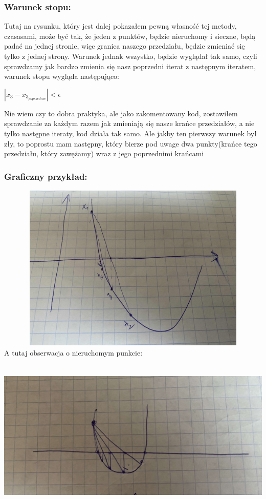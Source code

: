 \documentclass[12pt]{article}
\begin{document}
\subsubsection*{Warunek stopu:}
Tutaj na rysunku, który jest dalej pokazałem pewną własność tej metody, czasasami, może być tak, że jeden z punktów, będzie nieruchomy i sieczne, będą padać na jednej stronie, więc granica naszego przedziału, będzie zmieniać się tylko z jednej strony. Warunek jednak wszystko, będzie wyglądał tak samo, czyli sprawdzamy jak bardzo zmienia się nasz poprzedni iterat z następnym iteratem, warunek stopu wygląda następująco:
\begin{center}
    \begin{math}
        |x_{3}-x_{3_{poprzednie}}|<\epsilon
    \end{math}
\end{center}
Nie wiem czy to dobra praktyka, ale jako zakomentowany kod, zostawiłem sprawdzanie za każdym razem jak zmieniają się nasze krańce przedziałów, a nie tylko następne iteraty, kod działa tak samo. Ale jakby ten pierwszy warunek był zły, to poprostu mam następny, który bierze pod uwage dwa punkty(krańce tego przedziału, który zawężamy) wraz z jego poprzednimi krańcami
\subsubsection*{Graficzny przykład: }
\includegraphics[width=17cm,height=8cm, keepaspectratio]{falsi.jpg}
\newline
A tutaj obserwacja o nieruchomym punkcie: \newline
\includegraphics[width=17cm,height=8cm, keepaspectratio]{falsi_obserwacja.jpg}
\end{document}
